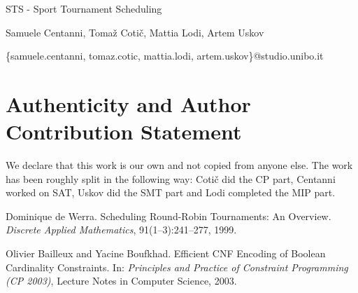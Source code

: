 \documentclass{article}
\date{September 2025}
\begin{document}
    \begin{titlepage}
        \begin{center}
            {\LARGE STS - Sport Tournament Scheduling }
            \vspace*{1em}
            
            Samuele Centanni, Tomaž Cotič, Mattia Lodi, Artem Uskov

            \centerline{\{samuele.centanni, tomaz.cotic, mattia.lodi, artem.uskov\}@studio.unibo.it}
        \end{center}
    \end{titlepage}

  

     
    



\section*{Authenticity and Author Contribution Statement}

We declare that this work is our own and not copied from anyone else. The work has been roughly split in the following way: Cotič did the CP part, Centanni worked on SAT, Uskov did the SMT part and Lodi completed the MIP part.

\begin{thebibliography}{9}

Dominique de Werra.
\newblock Scheduling Round-Robin Tournaments: An Overview.
\newblock \emph{Discrete Applied Mathematics}, 91(1–3):241--277, 1999.

Olivier Bailleux and Yacine Boufkhad.
\newblock Efficient CNF Encoding of Boolean Cardinality Constraints.
\newblock In: \emph{Principles and Practice of Constraint Programming (CP 2003)}, Lecture Notes in Computer Science, 2003.
\end{thebibliography}
\end{document}
